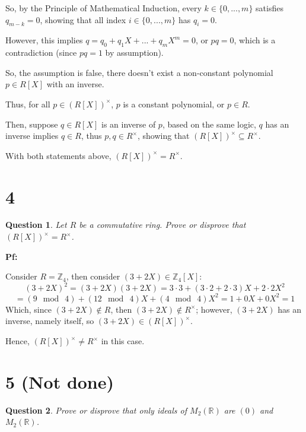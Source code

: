 \documentclass{article}
\newtheorem{question}{Question}
\begin{document}
So, by the Principle of Mathematical Induction, every $k\in \{0,...,m\}$ satisfies $q_{m-k}=0$, showing that all index $i\in\{0,...,m\}$ has $q_i=0$.

However, this implies $q = q_0+q_1X+...+q_mX^m = 0$, or $pq = 0$, which is a contradiction (since $pq=1$ by assumption).

So, the assumption is false, there doesn't exist a non-constant polynomial $p\in R[X]$ with an inverse.

Thus, for all $p\in (R[X])^\times$, $p$ is a constant polynomial, or $p\in R$.

Then, suppose $q\in R[X]$ is an inverse of $p$, based on the same logic, $q$ has an inverse implies $q\in R$, thus $p,q\in R^\times$, showing that $(R[X])^\times \subseteq R^\times$.

\hfill

With both statements above, $(R[X])^\times = R^\times$.


\hfill

\hfill


\section*{4}
\begin{myBox}[]{}
    \begin{question}
        Let $R$ be a commutative ring. Prove or disprove that $(R[X])^\times = R^\times$.
    \end{question}
\end{myBox}

\textbf{Pf:}

Consider $R=\mathbb{Z}_4$, then consider $(3+2X)\in \mathbb{Z}_4[X]$:
$$(3+2X)^2 = (3+2X)(3+2X) = 3\cdot 3 + (3\cdot 2+2\cdot 3)X + 2\cdot 2X^2$$
$$ = (9\mod\ 4)+(12\mod\ 4)X + (4\mod\ 4)X^2 = 1+0X+0X^2 = 1$$
Which, since $(3+2X)\notin R$, then $(3+2X)\notin R^\times$; however, $(3+2X)$ has an inverse, namely itself,
so $(3+2X)\in (R[X])^\times$.

Hence, $(R[X])^\times \neq R^\times$ in this case.

\break


\section*{5 (Not done)}
\begin{myBox}[]{}
    \begin{question}
        Prove or disprove that only ideals of $M_2(\mathbb{R})$ are $(0)$ and $M_2(\mathbb{R})$.
    \end{question}
\end{myBox}
\end{document}
